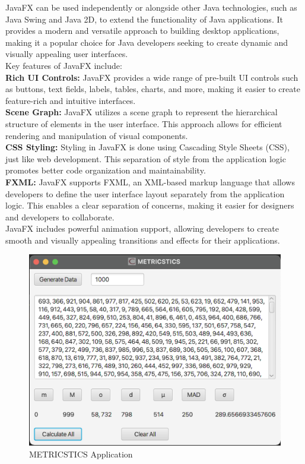 \documentclass[12pt,letterpaper]{report}
\begin{document}
JavaFX can be used independently or alongside other Java technologies, such as Java Swing and Java 2D, to extend the functionality of Java applications. It provides a modern and versatile approach to building desktop applications, making it a popular choice for Java developers seeking to create dynamic and visually appealing user interfaces.\\

Key features of JavaFX include:\\

\textbf{Rich UI Controls:} JavaFX provides a wide range of pre-built UI controls such as buttons, text fields, labels, tables, charts, and more, making it easier to create feature-rich and intuitive interfaces. \\

\textbf{Scene Graph:} JavaFX utilizes a scene graph to represent the hierarchical structure of elements in the user interface. This approach allows for efficient rendering and manipulation of visual components. \\

\textbf{CSS Styling:} Styling in JavaFX is done using Cascading Style Sheets (CSS), just like web development. This separation of style from the application logic promotes better code organization and maintainability. \\

\textbf{FXML:} JavaFX supports FXML, an XML-based markup language that allows developers to define the user interface layout separately from the application logic. This enables a clear separation of concerns, making it easier for designers and developers to collaborate. \\

JavaFX includes powerful animation support, allowing developers to create smooth and visually appealing transitions and effects for their applications. \\


\begin{figure}
    \begin{center}
    \includegraphics[width=0.5\linewidth]{app.png}
    \end{center}
       \caption{METRICSTICS Application \label{METRICSTICS Application}}
\end{figure}
\end{document}
